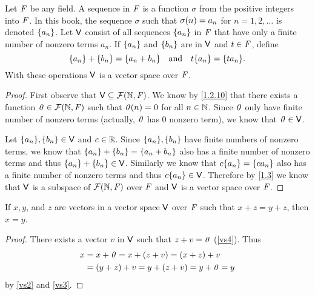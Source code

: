 \begin{eg}\label{1.2.13}
	Let \(\mathit{F}\) be any field.
	A sequence in \(\mathit{F}\) is a function \(\sigma\) from the positive integers into \(\mathit{F}\).
	In this book, the sequence \(\sigma\) such that \(\sigma\p{n} = a_{n}\) for \(n = 1, 2, \dots\) is denoted \(\left\lbrace a_{n}\right\rbrace\).
	Let \(\mathsf{V}\) consist of all sequences \(\left\lbrace a_{n}\right\rbrace\) in \(\mathit{F}\) that have only a finite number of nonzero terms \(a_{n}\).
	If \(\left\lbrace a_{n}\right\rbrace\) and \(\left\lbrace b_{n}\right\rbrace\) are in \(\mathsf{V}\) and \(t \in \mathit{F}\), define
	\[
		\set{a_{n}} + \set{b_{n}} = \set{a_{n} + b_{n}} \quad \text{and} \quad t\set{a_{n}} = \set{ta_{n}}.
	\]
	With these operations \(\mathsf{V}\) is a vector space over \(\mathit{F}\).
\end{eg}

\begin{proof}
	First observe that \(\V \subseteq \fs{\N}{\F}\).
	We know by \cref{1.2.10} that there exists a function \(\zv \in \fs{\N}{\F}\) such that \(\mathit{0}(n) = 0\) for all \(n \in \mathbb{N}\).
	Since \(\mathit{0}\) only have finite number of nonzero terms (actually, \(\mathit{0}\) has \(0\) nonzero term), we know that \(\mathit{0} \in \mathsf{V}\).

	Let \(\B{a_{n}}, \B{b_{n}} \in \V\) and \(c \in \mathbb{R}\).
	Since \(\B{a_{n}}, \B{b_{n}}\) have finite numbers of nonzero terms, we know that \(\left\lbrace a_{n}\right\rbrace + \left\lbrace b_{n}\right\rbrace = \left\lbrace a_{n} + b_{n}\right\rbrace\) also has a finite number of nonzero terms and thus \(\left\lbrace a_{n}\right\rbrace + \left\lbrace b_{n}\right\rbrace \in \mathsf{V}\).
	Similarly we know that \(c\B{a_{n}} = \B{ca_{n}}\) also has a finite number of nonzero terms and thus \(c\B{a_{n}} \in \V\).
	Therefore by \cref{1.3} we know that \(\mathsf{V}\) is a subspace of \(\fs{\N}{\F}\) over \(\mathit{F}\) and \(\mathsf{V}\) is a vector space over \(\mathit{F}\).
\end{proof}

\begin{thm}\label{1.1}
	If \(x, y\), and \(z\) are vectors in a vector space \(\mathsf{V}\) over \(\mathit{F}\) such that \(x + z = y + z\), then \(x = y\).
\end{thm}

\begin{proof}
	There exists a vector \(v\) in \(\mathsf{V}\) such that \(z + v = \mathit{0}\) (\ref{vs4}).
	Thus
	\begin{align*}
		x & = x + \mathit{0} = x + \left\lparen z + v\right\rparen = \left\lparen x + z\right\rparen + v     \\
		  & = \left\lparen y + z\right\rparen + v = y + \left\lparen z + v\right\rparen = y + \mathit{0} = y
	\end{align*}
	by \ref{vs2} and \ref{vs3}.
\end{proof}

